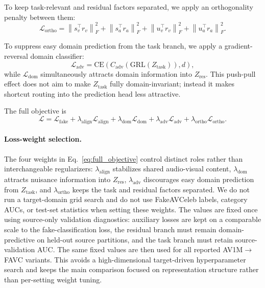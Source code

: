 \documentclass{article}
\begin{document}
To keep task-relevant and residual factors separated, we apply an orthogonality penalty between them:
\begin{equation}
\mathcal{L}_{\mathrm{ortho}} =
\left\| s_v^\top r_v \right\|_F^2
+ \left\| s_a^\top r_a \right\|_F^2
+ \left\| u_v^\top r_v \right\|_F^2
+ \left\| u_a^\top r_a \right\|_F^2.
\end{equation}

To suppress easy domain prediction from the task branch, we apply a gradient-reversal domain classifier:
\begin{equation}
\mathcal{L}_{\mathrm{adv}} =
\mathrm{CE}(C_{\mathrm{adv}}(\mathrm{GRL}(Z_{\mathrm{task}})), d),
\end{equation}
while $\mathcal{L}_{\mathrm{dom}}$ simultaneously attracts domain information into $Z_{\mathrm{res}}$. This push-pull effect does not aim to make $Z_{\mathrm{task}}$ fully domain-invariant; instead it makes shortcut routing into the prediction head less attractive.

The full objective is
\begin{equation}
\mathcal{L}
=
\mathcal{L}_{\mathrm{fake}}
+
\lambda_{\mathrm{align}} \mathcal{L}_{\mathrm{align}}
+
\lambda_{\mathrm{dom}} \mathcal{L}_{\mathrm{dom}}
+
\lambda_{\mathrm{adv}} \mathcal{L}_{\mathrm{adv}}
+
\lambda_{\mathrm{ortho}} \mathcal{L}_{\mathrm{ortho}}.
\label{eq:full_objective}
\end{equation}

\paragraph{Loss-weight selection.}
The four weights in Eq.~\eqref{eq:full_objective} control distinct roles rather than interchangeable regularizers: $\lambda_{\mathrm{align}}$ stabilizes shared audio-visual content, $\lambda_{\mathrm{dom}}$ attracts nuisance information into $Z_{\mathrm{res}}$, $\lambda_{\mathrm{adv}}$ discourages easy domain prediction from $Z_{\mathrm{task}}$, and $\lambda_{\mathrm{ortho}}$ keeps the task and residual factors separated. We do not run a target-domain grid search and do not use FakeAVCeleb labels, category AUCs, or test-set statistics when setting these weights. The values are fixed once using source-only validation diagnostics: auxiliary losses are kept on a comparable scale to the fake-classification loss, the residual branch must remain domain-predictive on held-out source partitions, and the task branch must retain source-validation AUC. The same fixed values are then used for all reported AV1M$\rightarrow$FAVC variants. This avoids a high-dimensional target-driven hyperparameter search and keeps the main comparison focused on representation structure rather than per-setting weight tuning.
\end{document}
